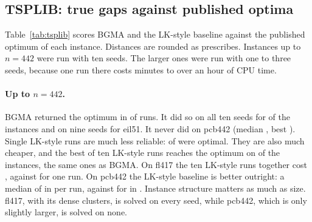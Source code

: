 \subsection{TSPLIB: true gaps against published optima}\label{sec:tsplib}

Table~\ref{tab:tsplib} scores BGMA  and the LK-style baseline against the published optimum of
each instance. Distances are rounded as  prescribes. Instances up to $n=442$ were run
with ten seeds. The larger ones were run with one to three seeds, because one  run there costs
minutes to over an hour of CPU time. 

\begin{table}[t]
\centering\scriptsize
\caption{TSPLIB  instances against published optima. Gaps are true gaps $L/L^\ast-1$.
``Serial time'' is the median CPU time of one  run (sum of its three units); with three worker
threads the wall clock is about a third of it. ``Below opt.''\ is how far the 600-iteration 1-tree bound
lies under the optimum, i.e.\ how much a bound gap would overstate the true gap.}
\label{tab:tsplib}
\setlength{\tabcolsep}{3pt}

\end{table}

\paragraph{Up to $n=442$.}
BGMA  returned the optimum in  of  runs. It did so on all ten
seeds for  of the  instances and on nine seeds for eil51. It never
did on pcb442 (median , best ). Single LK-style runs are
much less reliable:  of  were optimal. They are also much cheaper,
and the best of ten LK-style runs reaches the optimum on  of the  instances, the same ones as BGMA. On fl417 the
ten LK-style runs together cost , against  for one  run.
On pcb442 the LK-style baseline is better outright: a median of  in 
per run, against  for  in . Instance structure
matters as much as size. fl417, with its dense clusters, is solved on every seed, while pcb442, which
is only slightly larger, is solved on none.

